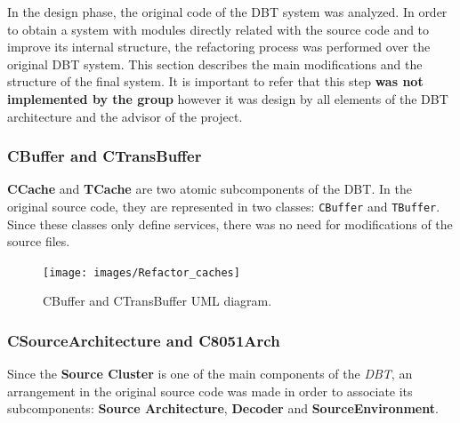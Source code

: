 In the design phase, the original code of the DBT system was analyzed. In order to obtain a system with modules directly related with the source code and to improve its internal structure, the refactoring process was performed over the original DBT system. This section describes the main modifications and the structure of the final system. It is important to refer that this step \textbf{was not implemented by the group} however it was design by all elements of the DBT architecture and the advisor of the project.


\subsubsection*{CBuffer and CTransBuffer}

\textbf{CCache} and \textbf{TCache} are two atomic subcomponents of the DBT. In the original source code, they are represented in two classes: \texttt{CBuffer} and \texttt{TBuffer}. Since these classes only define services, there was no need for modifications of the source files.

\begin{figure}[H]
\centerline{
\texttt{[image: images/Refactor\_caches]}
}
\caption{CBuffer and CTransBuffer UML diagram.}
\label{fig:refactorcaches} 
\end{figure}


\subsubsection*{CSourceArchitecture and C8051Arch}

Since the \textbf{Source Cluster} is one of the main components of the \textit{DBT}, an arrangement in the original source code was made in order to associate its subcomponents: \textbf{Source Architecture}, \textbf{Decoder} and \textbf{SourceEnvironment}. 

